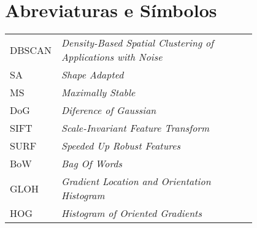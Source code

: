 \chapter*{Abreviaturas e Símbolos}

\begin{flushleft}
\begin{tabular}{l p{0.8\linewidth}}
DBSCAN   & \textit{Density-Based Spatial Clustering of Applications with Noise}\\
SA		 & \textit{Shape Adapted}\\
MS		 & \textit{Maximally Stable}\\
DoG      & \textit{Diference of Gaussian}\\
SIFT     & \textit{Scale-Invariant Feature Transform}\\
SURF     & \textit{Speeded Up Robust Features}\\
BoW		 & \textit{Bag Of Words}\\
GLOH     & \textit{Gradient Location and Orientation Histogram}\\
HOG      & \textit{Histogram of Oriented Gradients}

\end{tabular}
\end{flushleft}

